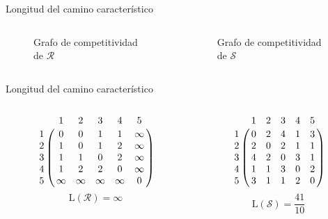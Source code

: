 \documentclass[10pt,hyperref={unicode}]{beamer}
\begin{document}
	\begin{frame}{Longitud del camino característico}
	\begin{ejemplo}
		\begin{columns}[t] %
			\begin{column}{.50\textwidth}
				\begin{figure}
					\centering
					\resizebox{!}{0.4\textheight}{\ejemplografocompetitividadevolutivo}
					\caption{Grafo de competitividad de $\mathcal{R}$}
				\end{figure}
			\end{column}%
			\hfill%
			\begin{column}{.50\textwidth}
				\begin{figure}
					\centering
					\resizebox{!}{0.4\textheight}{\ejemplofuerzamedia}
					\caption{Grafo de competitividad de $\mathcal{S}$}
				\end{figure}
			\end{column}%
		\end{columns}
	\end{ejemplo}
	\end{frame}
	
	\begin{frame}{Longitud del camino característico}
		\begin{ejemplo}[continuación]
			\begin{columns}[t] %
				\begin{column}{.50\textwidth}
					\begin{equation*}
					\bordermatrix{
						& 1 & 2 & 3 & 4 & 5 \cr
						1 &	0 & 0 & 1 & 1 & \infty \cr
						2 & 1 & 0 & 1 & 2 & \infty \cr
						3 & 1 & 1 & 0 & 2 & \infty \cr
						4 & 1 & 2 & 2 & 0 & \infty \cr
						5 & \infty & \infty & \infty & \infty  &  0  \cr
					}
					\end{equation*}
					\[ \mathrm{L}(\mathcal{R}) = \infty \]
				\end{column}%
				\hfill%
				\begin{column}{.50\textwidth}
					\begin{equation*}
					\bordermatrix{
						& 1 & 2 & 3 & 4 & 5 \cr
						1 &	0 & 2 & 4 & 1 & 3 \cr
						2 & 2 & 0 & 2 & 1 & 1 \cr
						3 & 4 & 2 & 0 & 3 & 1 \cr
						4 & 1 & 1 & 3 & 0 & 2 \cr
						5 & 3 & 1 & 1 & 2 & 0  \cr
					}
					\end{equation*}
					\[ \mathrm{L}(\mathcal{S}) = \dfrac{41}{10} \]
				\end{column}%
			\end{columns}
		\end{ejemplo}
	\end{frame}
	
\end{document}
